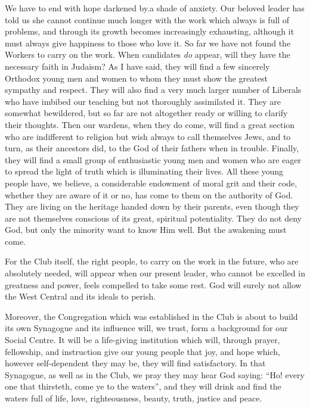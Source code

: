 We have to end with hope darkened by.a shade of
anxiety. Our beloved leader has told us she cannot
continue much longer with the work which always is full
of problems, and through its growth becomes increasingly
exhausting, although it must always give happiness to
those who love it. So far we have not found the Workers
to carry on the work. When candidates \textsl{do} appear, will
they have the necessary faith in Judaism? As I have said,
they will find a few sincerely Orthodox young men and
women to whom they must show the greatest sympathy
and respect. They will also find a very much larger
number of Liberals who have imbibed our teaching but
not thoroughly assimilated it. They are somewhat
bewildered, but so far are not altogether ready or
willing to clarify their thoughts. Then our wardens, when
they do come, will find a great section who are indifferent
to religion but wish always to call themselves Jews, and to
turn, as their ancestors did, to the God of their fathers
when in trouble. Finally, they will find a small group of
enthusiastic young men and women who are eager to
spread the light of truth which is illuminating their
lives. All these young people have, we believe, a considerable
endowment of moral grit and their code,
whether they are aware of it or no, has come to them on
the authority of God. They are living on the heritage
handed down by their parents, even though they are not
themselves conscious of its great, spiritual potentiality.
They do not deny God, but only the minority want
to know Him well. But the awakening must come.

For the Club itself, the right people, to carry on the
work in the future, who are absolutely needed, will
appear when our present leader, who cannot be excelled
in greatness and power, feels compelled to take some
rest. God will surely not allow the West Central and its
ideals to perish.

Moreover, the Congregation which was established
in the Club is about to build its own Synagogue and its
influence will, we trust, form a background for our
Social Centre. It will be a life-giving institution which
will, through prayer, fellowship, and instruction give
our young people that joy, and hope which, however
self-dependent they may be, they will find satisfactory.
In that Synagogue, as well as in the Club, we pray they
may hear God saying: “Ho! every one that thirsteth,
come ye to the waters”, and they will drink and find
the waters full of life, love, righteousness, beauty, truth,
justice and peace.
